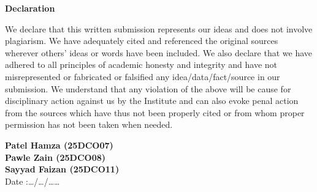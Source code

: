 \begin{center}
\thispagestyle{empty}
\LARGE{\textbf{Declaration}}\\[1.5cm]
\end{center}

We declare that this written submission represents our ideas and does not involve plagiarism. We have adequately cited and referenced the original sources wherever others' ideas or words have been included. We also declare that we have adhered to all principles of academic honesty and integrity and have not misrepresented or fabricated or falsified any idea/data/fact/source in our submission. We understand that any violation of the above will be cause for disciplinary action against us by the Institute and can also evoke penal action from the sources which have thus not been properly cited or from whom proper permission has not been taken when needed.

\vspace{2cm}
\noindent
\large{\textbf{Patel Hamza (25DCO07)}} \\[0.6cm]
\large{\textbf{Pawle Zain (25DCO08)}} \\[0.6cm]
\large{\textbf{Sayyad Faizan (25DCO11)}} \\

\vspace{4.5cm}
Date :\hspace{0.2cm}\ldots/\ldots/\ldots\ldots
